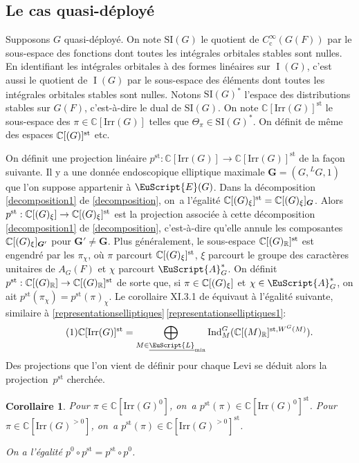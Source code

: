 \documentclass[JEP,XML,SOM,Unicode,francais]{cedram}
\let\mathcal \EuScript
\let\oldenumerate\enumerate
\renewcommand{\enumerate}{\oldenumerate\itemindent0pt}
\newenvironment{enumeratei}
{\bgroup\def\theenumi{\roman{enumi}}\def\theenumii{\arabic{enumii}}\oldenumerate}
{\endenumerate\egroup}
\newcommand{\NoChangel}[1]{%
\expandafter\let\csname old\string#1\endcsname=#1
\let#1=\relax
\newcommand{#1}{\mathcode`l="716C\csname old\string#1\endcsname\mathcode`l="7160 }%
}
\newcommand{\rc}{\mathrm{c}}
\newcommand{\Ell}{\mathrm{Ell}} \NoChangel{\Ell}
\newcommand{\Ind}{\mathrm{Ind}}
\newcommand{\Irr}{\mathrm{Irr}}
\newcommand{\SI}{\mathrm{SI}}
\newcommand{\st}{\mathrm{st}}
\DeclareMathOperator{\rI}{I}
\newcommand{\bG}{\boldsymbol{G}}
\newcommand{\cA}{\mathcal{A}}
\newcommand{\cE}{\mathcal{E}}
\newcommand{\cL}{\mathcal{L}}
\newcommand{\CC}{\mathbb{C}}
\newcommand{\RR}{\mathbb{R}}
\theoremstyle{plain}
\newtheorem*{cor*}{Corollaire}
\theoremstyle{definition}
\begin{document}
\subsection{Le cas quasi-déployé}\label{lecasquasideploye}
Supposons $G$ quasi-déployé. On note $\SI(G)$ le quotient de $C_{\rc}^{\infty}(G(F))$ par le sous-espace des fonctions dont toutes les intégrales orbitales stables sont nulles. En identifiant les intégrales orbitales à des formes linéaires sur $\rI(G)$, c'est aussi le quotient de $\rI(G)$ par le sous-espace des éléments dont toutes les intégrales orbitales stables sont nulles. Notons
$\SI(G)^*$ l'espace des distributions stables sur $G(F)$, c'est-à-dire le dual de $\SI(G)$. On note $\CC[\Irr(G)]^{\st}$ le sous-espace des $\pi\in \CC[\Irr(G)]$ telles que $\Theta_{\pi}\in \SI(G)^*$. On définit de même des espaces $\CC[\Ell(G)]^{\st}$ etc.

On définit une projection linéaire $p^{\st}:\CC[\Irr(G)]\to \CC[\Irr(G)]^{\st}$ de la façon suivante.
Il y a une donnée endoscopique elliptique maximale $\bG=(G,{^LG},1)$ que l'on suppose appartenir à $\cE(G)$. Dans la décomposition \eqref{decomposition1} de \ref{decomposition}, on~a l'égalité $\CC[\Ell(G)_{\xi}]^{\st} =\CC[\Ell(G)_{\xi}]_{\bG}$. Alors $p^{\st}:\CC[\Ell(G)_{\xi}]\to \CC[\Ell(G)_{\xi}]^{\st}$ est la projection associée à cette décomposition \eqref{decomposition1} de \ref{decomposition}, c'est-à-dire qu'elle annule les composantes $\CC[\Ell(G)_{\xi}]_{\bG'}$ pour $\bG'\neq\bG$.
Plus généralement, le sous-espace $\CC[\Ell(G)_{\RR}]^{\st}$ est engendré par les $\pi_{\chi}$, où $\pi$ parcourt $\CC[\Ell(G)_{\xi}]^{\st}$, $\xi$ parcourt le groupe des caractères unitaires de $A_{G}(F)$ et $\chi$ parcourt $\cA_{G}^*$. On définit $p^{\st}:\CC[\Ell(G)_{\RR}]\to \CC[\Ell(G)_{\RR}]^{\st}$ de sorte que, si $\pi\in \CC[\Ell(G)_{\xi}]$ et $\chi\in \cA_{G}^*$, on ait $p^{\st}(\pi_{\chi})=p^{\st}(\pi)_{\chi}$.
Le corollaire XI.3.1 de \cite{MW} équivaut à l'égalité suivante, similaire à \ref{representationselliptiques}\,\eqref{representationselliptiques1}:\vspace*{-3pt}\enlargethispage{.6\baselineskip}%
\begin{equation}\tag{1}\label{lecasquasideploye1}
\CC[\Irr(G)]^{\st}=\bigoplus_{M\in \underline{\cL}_{\min}}\Ind_{M}^G(\CC[\Ell(M)_{\RR}]^{\st,W^G(M)}).
\end{equation}
Des projections que l'on vient de définir pour chaque Levi se déduit alors la projection~$p^{\st}$ cherchée.

\skpt
\begin{cor*}
\begin{enumeratei}
\item\label{lecasquasideployei}
Pour $\pi\in \CC[\Irr(G)^0]$, on~a $p^{\st}(\pi)\in \CC[\Irr(G)^0]^{\st}$. Pour $\pi\in \CC[\Irr(G)^{>0}]$, on~a $p^{\st}(\pi)\in \CC[\Irr(G)^{>0}]^{\st}$.

\item\label{lecasquasideployeii}
On a l'égalité $p^0\circ p^{\st}=p^{\st}\circ p^0$.
\end{enumeratei}
\end{cor*}
\end{document}
